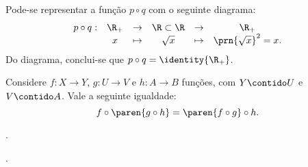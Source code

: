 \begin{solution}
Pode-se representar a função $p \circ q$ com o seguinte diagrama:
%
\begin{equation*}
\begin{array}{cccccc}
p \circ q : & \R_+ & \to     & \R \subset \R & \to     & \R_+ \\
		  &  x  & \mapsto & \sqrt x       & \mapsto & \prn{\sqrt x}^2 = x.
\end{array}
\end{equation*}
%
Do diagrama, conclui-se que $p \circ q = \identity{\R_+}$.
\end{solution}

\begin{proposition}
	Considere $f : X \to Y $, $g : U \to V $ e $h: A \to B $ funções, com $Y \contido U$ e $V \contido A$. Vale a seguinte igualdade:
	$$f \circ \paren{g \circ h} = \paren{f \circ g} \circ h.$$ 
\end{proposition}

\begin{onlineact}
	.
\end{onlineact}

\begin{onlineact}
	.
\end{onlineact}